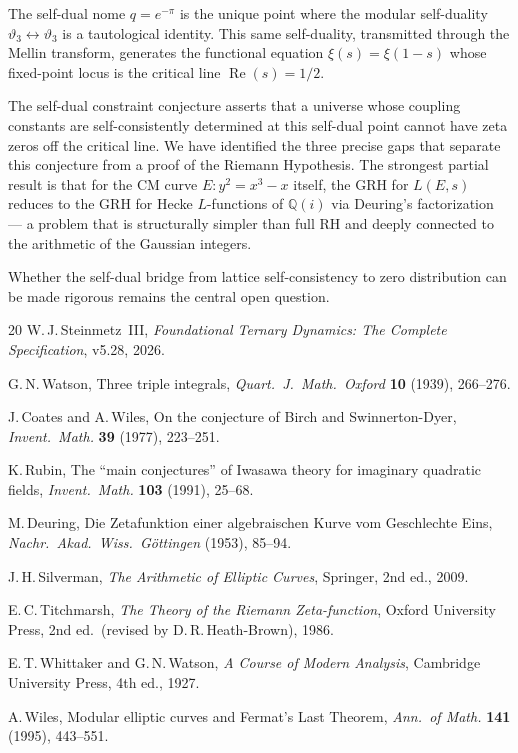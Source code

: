 \documentclass[11pt]{article}
\theoremstyle{tight}
\theoremstyle{plainroman}
\newcommand{\Q}{\mathbb{Q}}
\begin{document}
The self-dual nome $q=e^{-\pi}$ is the unique point where the modular self-duality $\vartheta_3\leftrightarrow\vartheta_3$ is a tautological identity.
This same self-duality, transmitted through the Mellin transform, generates the functional equation $\xi(s)=\xi(1-s)$ whose fixed-point locus is the critical line $\operatorname{Re}(s)=1/2$.

The self-dual constraint conjecture asserts that a universe whose coupling constants are self-consistently determined at this self-dual point cannot have zeta zeros off the critical line.
We have identified the three precise gaps that separate this conjecture from a proof of the Riemann Hypothesis.
The strongest partial result is that for the CM curve $E:y^2=x^3-x$ itself, the GRH for $L(E,s)$ reduces to the GRH for Hecke $L$-functions of $\Q(i)$ via Deuring's factorization --- a problem that is structurally simpler than full RH and deeply connected to the arithmetic of the Gaussian integers.

Whether the self-dual bridge from lattice self-consistency to zero distribution can be made rigorous remains the central open question.

\begin{thebibliography}{20}
W.\,J.\,Steinmetz~III,
\emph{Foundational Ternary Dynamics: The Complete Specification}, v5.28, 2026.

G.\,N.\,Watson,
Three triple integrals,
\emph{Quart.\ J.\ Math.\ Oxford} \textbf{10} (1939), 266--276.

J.\,Coates and A.\,Wiles,
On the conjecture of Birch and Swinnerton-Dyer,
\emph{Invent.\ Math.} \textbf{39} (1977), 223--251.

K.\,Rubin,
The ``main conjectures'' of Iwasawa theory for imaginary quadratic fields,
\emph{Invent.\ Math.} \textbf{103} (1991), 25--68.

M.\,Deuring,
Die Zetafunktion einer algebraischen Kurve vom Geschlechte Eins,
\emph{Nachr.\ Akad.\ Wiss.\ G\"ottingen} (1953), 85--94.

J.\,H.\,Silverman,
\emph{The Arithmetic of Elliptic Curves},
Springer, 2nd ed., 2009.

E.\,C.\,Titchmarsh,
\emph{The Theory of the Riemann Zeta-function},
Oxford University Press, 2nd ed.\ (revised by D.\,R.\,Heath-Brown), 1986.

E.\,T.\,Whittaker and G.\,N.\,Watson,
\emph{A Course of Modern Analysis},
Cambridge University Press, 4th ed., 1927.

A.\,Wiles,
Modular elliptic curves and Fermat's Last Theorem,
\emph{Ann.\ of Math.} \textbf{141} (1995), 443--551.
\end{thebibliography}
\end{document}
